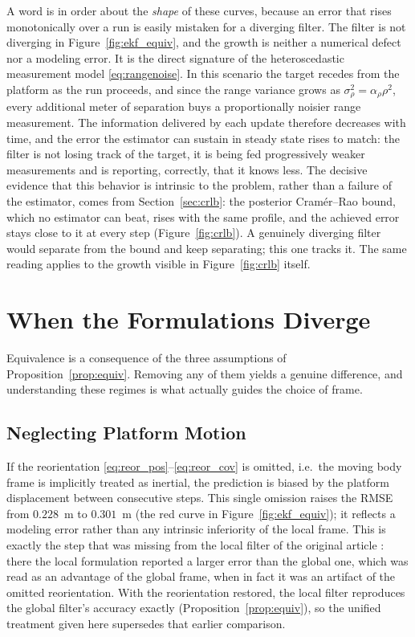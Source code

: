 A word is in order about the \emph{shape} of these curves, because an error that
rises monotonically over a run is easily mistaken for a diverging filter. The
filter is not diverging in Figure~\ref{fig:ekf_equiv}, and the growth is neither a
numerical defect nor a modeling error. It is the direct signature of the
heteroscedastic measurement model \eqref{eq:rangenoise}. In this scenario the
target recedes from the platform as the run proceeds, and since the range variance
grows as $\sigma_\rho^2=\alpha_\rho\rho^2$, every additional meter of separation
buys a proportionally noisier range measurement. The information delivered by each
update therefore decreases with time, and the error the estimator can sustain in
steady state rises to match: the filter is not losing track of the target, it is
being fed progressively weaker measurements and is reporting, correctly, that it
knows less. The decisive evidence that this behavior is intrinsic to the problem,
rather than a failure of the estimator, comes from Section~\ref{sec:crlb}: the
posterior Cram\'er--Rao bound, which no estimator can beat, rises with the same
profile, and the achieved error stays close to it at every step
(Figure~\ref{fig:crlb}). A genuinely diverging filter would separate from the
bound and keep separating; this one tracks it. The same reading applies to the
growth visible in Figure~\ref{fig:crlb} itself.

\section{When the Formulations Diverge}
\label{sec:diverge}

Equivalence is a consequence of the three assumptions of
Proposition~\ref{prop:equiv}. Removing any of them yields a genuine difference,
and understanding these regimes is what actually guides the choice of frame.

\subsection{Neglecting Platform Motion}

If the reorientation \eqref{eq:reor_pos}--\eqref{eq:reor_cov} is omitted, i.e.\
the moving body frame is implicitly treated as inertial, the prediction is
biased by the platform displacement between consecutive steps. This single
omission raises the RMSE from $0.228$~m to $0.301$~m (the red curve in
Figure~\ref{fig:ekf_equiv}); it reflects a modeling error rather than any
intrinsic inferiority of the local frame. This is exactly the step that was
missing from the local filter of the original article :
there the local formulation reported a larger error than the global one, which
was read as an advantage of the global frame, when in fact it was an artifact of
the omitted reorientation. With the reorientation restored, the local filter
reproduces the global filter's accuracy exactly (Proposition~\ref{prop:equiv}), so
the unified treatment given here supersedes that earlier comparison.

